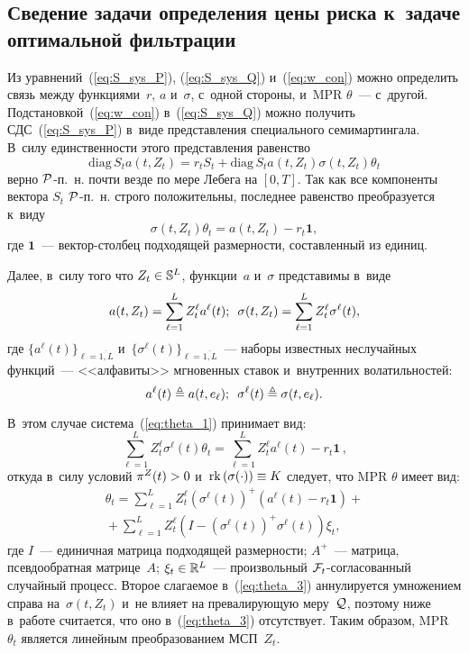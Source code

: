 \begin{multicols}{2}
\section{Сведение задачи определения цены риска к~задаче оптимальной фильтрации}

Из уравнений~(\ref{eq:S_sys_P}), (\ref{eq:S_sys_Q}) и~(\ref{eq:w_con}) можно определить связь между функциями~$r$, $a$ и~$\sigma$, 
с~одной стороны, и~MPR $\theta$~--- с~другой. Подстановкой~(\ref{eq:w_con}) в~(\ref{eq:S_sys_Q}) можно получить СДС~(\ref{eq:S_sys_P}) 
в~виде представления специального семимартингала. В~силу единственности этого представления равенство
$$
\mathrm{diag}\, S_t a(t,Z_t) = r_t S_t +\mathrm{diag}\, S_t a(t,Z_t) \sigma (t,Z_t)\theta_t
$$
верно ${\mathcal P}$-п.~н. почти везде по мере Лебега на $[0,T]$. Так как 
все компоненты вектора $S_t$ ${\mathcal P}$-п.~н. строго положительны, последнее равенство преобразуется к~виду
   \begin{equation}
  \sigma (t,Z_t)\theta_t = a(t,Z_t) - r_t \mathbf{1} ,
  \label{eq:theta_1}
  \end{equation}
  где $\mathbf{1}$~--- век\-тор-стол\-бец подходящей раз\-мер\-ности, со\-став\-лен\-ный из единиц.

  Далее, в~силу того что $Z_t \hm\in \mathbb{S}^L$,  функции~$a$ и~$\sigma$ представимы в~виде
  $$
  a(t,Z_t) = \sum\limits_{\ell=1}^L Z_t^{\ell} a^{\ell}(t); \enskip  \sigma(t,Z_t) = \sum\limits_{\ell=1}^L Z_t^{\ell}  \sigma^{\ell}(t),
$$
  где 
  $\{a^{\ell}(t)\}_{\ell= \overline{1,L}}$ и~$\{\sigma^{\ell}(t)\}_{\ell= \overline{1,L}}$~--- наборы известных
  неслучайных функций~--- <<алфавиты>> мгновенных ставок и~внут\-рен\-них волатильностей: 
  $$
  a^{\ell}(t) \hm\ebd a(t,e_{\ell});\enskip \sigma^{\ell}(t) \hm\ebd \sigma(t,e_{\ell}).
  $$ 
  
  В~этом случае сис\-те\-ма~(\ref{eq:theta_1}) принимает вид:
 \begin{equation*}
 \sum\limits_{\ell=1}^L Z_t^{\ell} \sigma^{\ell}(t)\theta_t = \sum\limits_{\ell=1}^L Z_t^{\ell} a^{\ell}(t) - r_t \mathbf{1}\,,
 \end{equation*}
 откуда в~силу условий $\pi^Z(t)\hm>0$ и~$\mathrm{rk}\left(\sigma(\cdot)\right) \hm\equiv K$ следует, что MPR $\theta$ имеет вид:
 \begin{multline}
\theta_t = \sum\limits_{\ell=1}^L Z_t^{\ell} \left(\sigma^{\ell}(t)\right)^+ \left( a^{\ell}(t) - r_t \mathbf{1} \right) +{}\\
{}+
\sum\limits_{\ell=1}^L Z_t^{\ell}
\left(I-
\left(\sigma^{\ell}(t)\right)^+\sigma^{\ell}(t) \right)\xi_t,
 \label{eq:theta_3}
 \end{multline}
 где $I$~--- единичная матрица подходящей размерности; $A^+$~--- мат\-ри\-ца, псев\-до\-об\-рат\-ная мат\-ри\-це~$A$; 
 $\xi_t \hm\in \mathbb{R}^L$~--- произвольный ${\mathcal F}_t$-со\-гла\-со\-ван\-ный случайный процесс.
 Второе слагаемое в~(\ref{eq:theta_3}) аннулируется умножением справа на~$\sigma(t,Z_t)$ и~не влияет на превалирующую меру~${\mathcal Q}$, 
 поэтому ниже в~работе считается, что оно в~(\ref{eq:theta_3}) отсутствует. Таким образом, MPR $\theta_t$  является линейным преобразованием МСП~$Z_t$.


\end{multicols}
